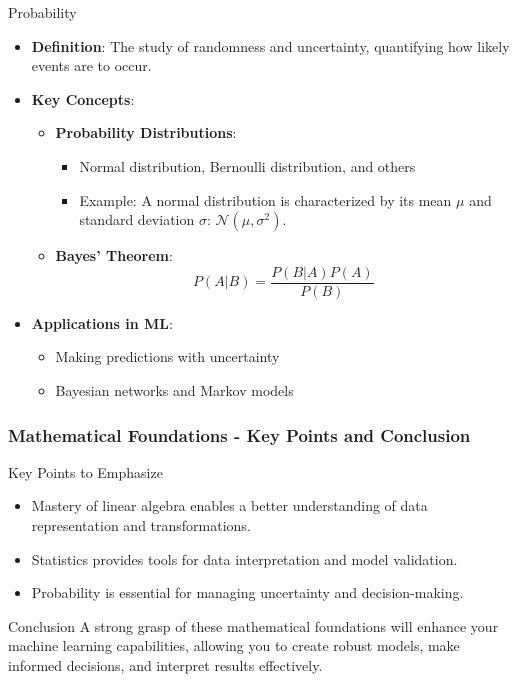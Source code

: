 \documentclass{beamer}
\begin{document}
\begin{frame}[fragile]
    \begin{block}{Probability}
        \begin{itemize}
            \item \textbf{Definition}: The study of randomness and uncertainty, quantifying how likely events are to occur.
            \item \textbf{Key Concepts}:
                \begin{itemize}
                    \item \textbf{Probability Distributions}:
                        \begin{itemize}
                            \item Normal distribution, Bernoulli distribution, and others
                            \item Example: A normal distribution is characterized by its mean \( \mu \) and standard deviation \( \sigma \): \( \mathcal{N}(\mu, \sigma^2) \).
                        \end{itemize}
                    \item \textbf{Bayes' Theorem}:
                        \begin{equation}
                            P(A|B) = \frac{P(B|A) P(A)}{P(B)}
                        \end{equation}
                \end{itemize}
            \item \textbf{Applications in ML}:
                \begin{itemize}
                    \item Making predictions with uncertainty 
                    \item Bayesian networks and Markov models
                \end{itemize}
        \end{itemize}
    \end{block}
\end{frame}

\begin{frame}[fragile]
    \frametitle{Mathematical Foundations - Key Points and Conclusion}
    \begin{block}{Key Points to Emphasize}
        \begin{itemize}
            \item Mastery of linear algebra enables a better understanding of data representation and transformations.
            \item Statistics provides tools for data interpretation and model validation.
            \item Probability is essential for managing uncertainty and decision-making.
        \end{itemize}
    \end{block}
    
    \begin{block}{Conclusion}
        A strong grasp of these mathematical foundations will enhance your machine learning capabilities, allowing you to create robust models, make informed decisions, and interpret results effectively.
    \end{block}
\end{frame}
\end{document}
